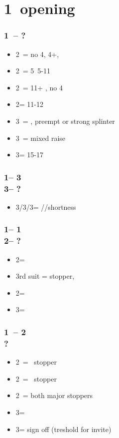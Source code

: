 \documentclass[12pt, a4paper]{report}
\begin{document}
\section*{\colorbox{blue!30}{1\diams\ opening}}
 {

    \subsubsection*{1\diams\ -- ?}
    \begin{itemize}
        \item 2\diams\ = no 4\major, 4+\diams, \invp
        \item 2\hearts\ = 5\hearts\ 5-11
        \item 2\spades\ = 11+ \bal, no 4\major
        \item 2\nt = 11-12 \bal
        \item 3\clubs\ = \diams, preempt or strong splinter
        \item 3\diams\ = mixed raise
        \item 3\nt = 15-17 \bal
    \end{itemize}

    \subsubsection*{1\diams -- 3\clubs\\
                    3\diams -- ?}
    \begin{itemize}
        \item 3\hearts/3\spades/3\nt = \hearts/\spades/\clubs shortness
    \end{itemize}

    \subsubsection*{1\diams -- 1\major\\
                    2\diams -- ?}
    \begin{itemize}
        \item 2\major = \nf
        \item 3rd suit = stopper, \gf
        \item 2\nt = \gf
        \item 3\diams = \inv
    \end{itemize}

    \subsubsection*{1\diams\ -- 2\diams \\ ?}
    \begin{itemize}
        \item 2\hearts\ = \hearts\ stopper
        \item 2\spades\ = \spades\ stopper
        \item 2\nt\ = both major stoppers
        \item 3\clubs = \nat
        \item 3\diams = sign off (treshold for invite)
    \end{itemize}

}
\end{document}
